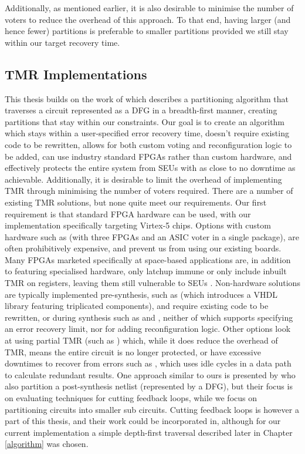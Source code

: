 \documentclass[12pt,final,oneside]{dwThesis} %
\begin{document}
   Additionally, as mentioned earlier, it is also desirable to minimise the
   number of voters to reduce the overhead of this approach. To that end,
   having larger (and hence fewer) partitions is preferable to smaller
   partitions provided we still stay within our target recovery time.

   \subsection{\gls{TMR}
      Implementations} This thesis builds on the
   work of\cite{DiesselChange} which describes a partitioning algorithm that
   traverses a circuit represented as a \gls{DFG} in a breadth-first manner,
   creating partitions that stay within our constraints.  Our goal is to create an
   algorithm which stays within a user-specified error recovery time, doesn't
   require existing code to be rewritten, allows for both custom voting and
   reconfiguration logic to be added, can use industry standard \glspl{FPGA}
   rather than custom hardware, and effectively protects the entire system from
   \glspl{SEU} with as close to no downtime as achievable.  Additionally, it is
   desirable to limit the overhead of implementing \gls{TMR} through minimising
   the number of voters required.  There are a number of existing \gls{TMR}
   solutions, but none quite meet our requirements.  Our first requirement is
   that standard \gls{FPGA} hardware can be used, with our implementation
   specifically targeting Virtex-5 chips. Options with custom hardware such as
   \cite{VFPGATMR} (with three \glspl{FPGA} and an \gls{ASIC} voter in a single
   package), are often prohibitively expensive, and prevent us from using our
   existing boards.  Many \glspl{FPGA} marketed specifically at space-based
   applications are, in addition to featuring specialised hardware, only
   latchup immune or only include inbuilt \gls{TMR} on registers,
   leaving them still vulnerable to \glspl{SEU} \cite{FPGAReview}.  Non-hardware
   solutions are typically implemented pre-synthesis, such as \cite{ftmr} (which
   introduces a \gls{VHDL} library featuring triplicated components), and require
   existing code to be rewritten, or during synthesis such as \cite{synplify} and
   \cite{tmrtool}, neither of which supports specifying an error recovery limit, nor
   for adding reconfiguration logic.  Other options look at using partial
   \gls{TMR} (such as \cite{partialTMR}) which, while it does reduce the overhead
   of \gls{TMR}, means the entire circuit is no longer protected, or have
   excessive downtimes to recover from errors such as \cite{VTMR}, which uses idle
   cycles in a data path to calculate redundant results.  One approach similar to
   ours is presented by \cite{PostSynth} who also partition a post-synthesis
   netlist (represented by a \gls{DFG}), but their focus is on evaluating
   techniques for cutting feedback loops, while we focus on partitioning circuits
   into smaller sub circuits. Cutting feedback loops is however a part of this
   thesis, and their work could be incorporated in, although for our current
   implementation a simple depth-first traversal described later in Chapter \ref{algorithm} was chosen.
\end{document}
